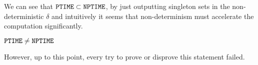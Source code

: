 We can see that $\mathtt{PTIME}\subset \mathtt{NPTIME}$, by just outputting singleton sets in 
the non-deterministic $\delta$ and intuitively it seems that non-determinism 
must accelerate the computation significantly.

\begin{thesis}
	$\mathtt{PTIME}\neq\mathtt{NPTIME}$
\end{thesis}

However, up to this point, every try to prove or disprove this statement failed.
